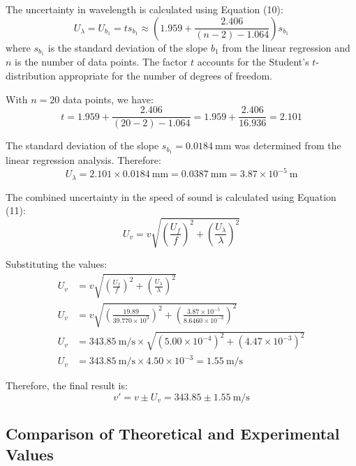 \documentclass[12pt]{article}
\begin{document}
The uncertainty in wavelength is calculated using Equation (10):
\begin{equation}
U_\lambda = U_{b_1} = ts_{b_1} \approx \left(1.959 + \frac{2.406}{(n-2) - 1.064}\right) s_{b_1}
\end{equation}
where $s_{b_1}$ is the standard deviation of the slope $b_1$ from the linear regression and $n$ is the number of data points. The factor $t$ accounts for the Student's $t$-distribution appropriate for the number of degrees of freedom.

With $n = 20$ data points, we have:
\begin{equation}
t = 1.959 + \frac{2.406}{(20-2) - 1.064} = 1.959 + \frac{2.406}{16.936} = 2.101
\end{equation}

The standard deviation of the slope $s_{b_1} = 0.0184~\si{\milli\meter}$ was determined from the linear regression analysis. Therefore:
\begin{equation}
U_\lambda = 2.101 \times 0.0184~\si{\milli\meter} = 0.0387~\si{\milli\meter} = 3.87 \times 10^{-5}~\si{\meter}
\end{equation}

The combined uncertainty in the speed of sound is calculated using Equation (11):
\begin{equation}
U_v = v\sqrt{\left(\frac{U_f}{f}\right)^2 + \left(\frac{U_\lambda}{\lambda}\right)^2}
\end{equation}

Substituting the values:
\begin{align}
U_v &= v\sqrt{\left(\frac{U_f}{f}\right)^2 + \left(\frac{U_\lambda}{\lambda}\right)^2} \\
U_v &= v\sqrt{\left(\frac{19.89}{39.770 \times 10^3}\right)^2 + \left(\frac{3.87 \times 10^{-5}}{8.6460 \times 10^{-3}}\right)^2} \\
U_v &= 343.85~\si{\meter\per\second} \times \sqrt{(5.00 \times 10^{-4})^2 + (4.47 \times 10^{-3})^2} \nonumber \\
U_v &= 343.85~\si{\meter\per\second} \times 4.50 \times 10^{-3} = 1.55~\si{\meter\per\second}
\end{align}

Therefore, the final result is:
\begin{equation}
v' = v \pm U_v = 343.85 \pm 1.55~\si{\meter\per\second}
\end{equation}

\subsection{Comparison of Theoretical and Experimental Values}
\end{document}
